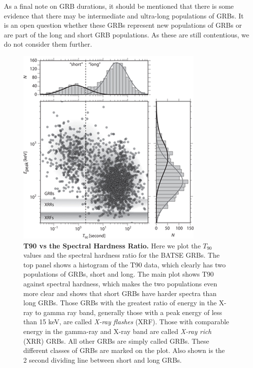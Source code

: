 \documentclass[11pt]{cuthesis}
\begin{document}
As a final note on GRB durations, it should be mentioned that there is some evidence that there may be intermediate and ultra-long populations of GRBs\cite{ul_grbs}. It is an open question whether these GRBs represent new populations of GRBs or are part of the long and short GRB populations. As these are still contentious, we do not consider them further. 

\begin{figure} %
\begin{center}
\includegraphics[width=0.6\linewidth]{t90_vs_hardness_new.jpg}
\end{center}
\caption{\textbf{T90 vs the Spectral Hardness Ratio.} Here we plot the $T_{90}$ values and the spectral hardness ratio for the BATSE GRBs. The top panel shows a histogram of the T90 data, which clearly has two populations of GRBs, short and long. The main plot shows T90 against spectral hardness, which makes the two populations even more clear and shows that short GRBs have harder spectra than long GRBs. Those GRBs with the greatest ratio of energy in the X-ray to gamma ray band, generally those with a peak energy of less than 15 keV, are called \textit{X-ray flashes} (XRF). Those with comparable energy in the gamma-ray and X-ray band are called \textit{X-ray rich} (XRR) GRBs. All other GRBs are simply called GRBs. These different classes of GRBs are marked on the plot. Also shown is the 2 second dividing line between short and long GRBs.\cite{bloom_grbs}}
\label{fig:t90 vs hardness}
\end{figure}
\end{document}
